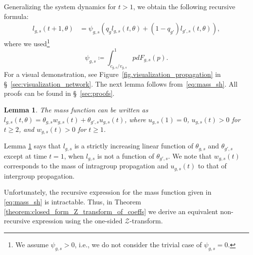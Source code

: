 \documentclass[letterpaper]{article} %
\newtheorem{lemma}{Lemma}
\begin{document}
Generalizing the system dynamics for $t>1$, we obtain the following recursive formula:
\footnotesize
\begin{equation}
\label{eq:mass_sh}
\begin{split}
    l_{g, s}(t+1,\theta) %
    &= \psi_{g,s}(q_g l_{g,s}(t,\theta) + (1-q_{g'}) l_{g', s}(t,\theta)),
\end{split}
\end{equation}
\normalsize
where we used\footnote{We assume $\psi_{g,s} > 0$, i.e., we do not consider the trivial case of $\psi_{g,s} = 0$.}
\[
    \psi_{g,s} \coloneqq \int_{c_{g,s}/v_{g,s}}^1 p d F_{g,s}(p).
\]
For a visual demonstration, see Figure~\ref{fig.visualization_propagation} in \S~\ref{sec:visualization_network}.
%
The next lemma follows from~\eqref{eq:mass_sh}.
%
All proofs can be found in \S~\ref{sec:proofs}.

\begin{lemma}
\label{lemma:incr_linear}
     The mass function can be written as $l_{g,s}(t,\theta) = \theta_{g,s}w_{g,s}(t) + \theta_{g',s}u_{g,s}(t)$, where $u_{g,s}(1) = 0$, $u_{g,s}(t) > 0$ for $t\geq 2$, and $w_{g,s}(t) > 0$ for $t \geq 1$.
\end{lemma}
Lemma \ref{lemma:incr_linear} says that $l_{g,s}$ is a strictly increasing linear function of $\theta_{g,s}$ and $\theta_{g',s}$ except at time $t=1$, when $l_{g,s}$ is not a function of $\theta_{g',s}$.
%
We note that $w_{g,s}(t)$ corresponds to the mass of intragroup propagation and $u_{g,s}(t)$ to that of intergroup propagation.

Unfortunately, the recursive expression for the mass function given in \eqref{eq:mass_sh} is intractable.
%
Thus, in Theorem \ref{theorem:closed_form_Z_transform_of_coeffs} we derive an equivalent non-recursive expression using the one-sided $\mathcal{Z}$-transform.
\end{document}
